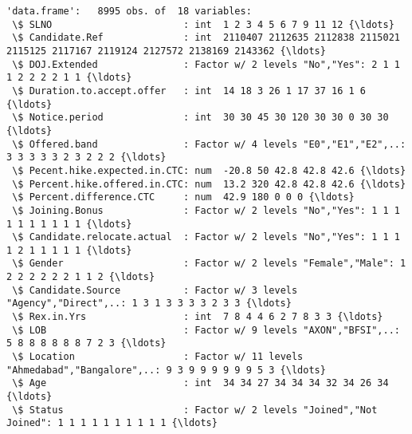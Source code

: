 \documentclass[11pt]{article}
\begin{document}
    \begin{Verbatim}[commandchars=\\\{\}]
'data.frame':	8995 obs. of  18 variables:
 \$ SLNO                       : int  1 2 3 4 5 6 7 9 11 12 {\ldots}
 \$ Candidate.Ref              : int  2110407 2112635 2112838 2115021 2115125 2117167 2119124 2127572 2138169 2143362 {\ldots}
 \$ DOJ.Extended               : Factor w/ 2 levels "No","Yes": 2 1 1 1 2 2 2 2 1 1 {\ldots}
 \$ Duration.to.accept.offer   : int  14 18 3 26 1 17 37 16 1 6 {\ldots}
 \$ Notice.period              : int  30 30 45 30 120 30 30 0 30 30 {\ldots}
 \$ Offered.band               : Factor w/ 4 levels "E0","E1","E2",..: 3 3 3 3 3 2 3 2 2 2 {\ldots}
 \$ Pecent.hike.expected.in.CTC: num  -20.8 50 42.8 42.8 42.6 {\ldots}
 \$ Percent.hike.offered.in.CTC: num  13.2 320 42.8 42.8 42.6 {\ldots}
 \$ Percent.difference.CTC     : num  42.9 180 0 0 0 {\ldots}
 \$ Joining.Bonus              : Factor w/ 2 levels "No","Yes": 1 1 1 1 1 1 1 1 1 1 {\ldots}
 \$ Candidate.relocate.actual  : Factor w/ 2 levels "No","Yes": 1 1 1 1 2 1 1 1 1 1 {\ldots}
 \$ Gender                     : Factor w/ 2 levels "Female","Male": 1 2 2 2 2 2 2 1 1 2 {\ldots}
 \$ Candidate.Source           : Factor w/ 3 levels "Agency","Direct",..: 1 3 1 3 3 3 3 2 3 3 {\ldots}
 \$ Rex.in.Yrs                 : int  7 8 4 4 6 2 7 8 3 3 {\ldots}
 \$ LOB                        : Factor w/ 9 levels "AXON","BFSI",..: 5 8 8 8 8 8 8 7 2 3 {\ldots}
 \$ Location                   : Factor w/ 11 levels "Ahmedabad","Bangalore",..: 9 3 9 9 9 9 9 9 5 3 {\ldots}
 \$ Age                        : int  34 34 27 34 34 34 32 34 26 34 {\ldots}
 \$ Status                     : Factor w/ 2 levels "Joined","Not Joined": 1 1 1 1 1 1 1 1 1 1 {\ldots}

    \end{Verbatim}
\end{document}
